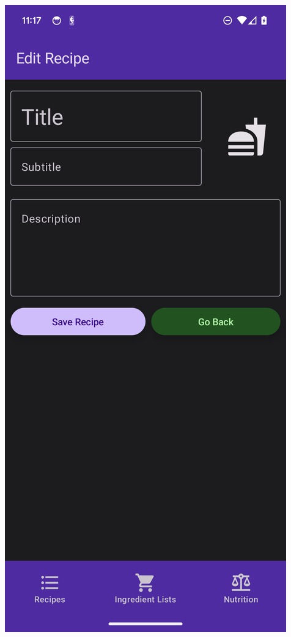 \documentclass[12pt]{article}
\begin{document}
\begin{center}
\includegraphics[scale=0.175]{../res/img/NewRecipeDark.png}

\end{center}
\end{document}

